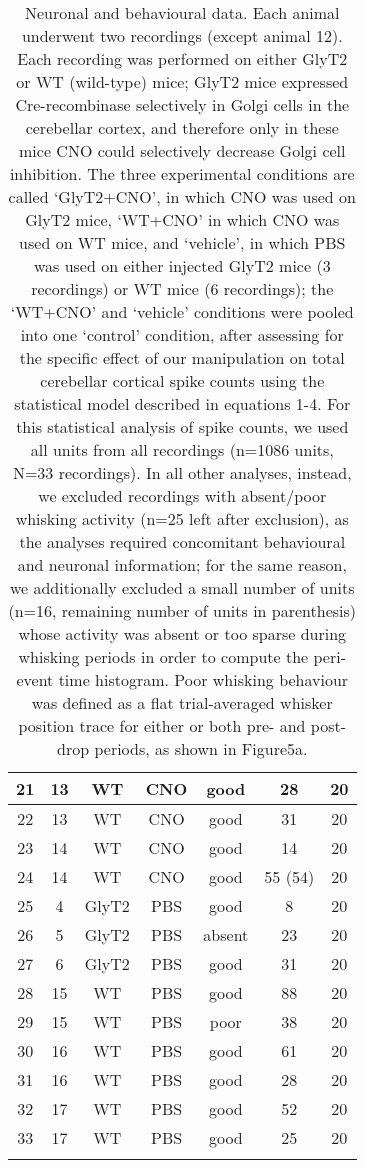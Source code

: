 \documentclass{article}
\begin{document}
\begin{longtable}{|c|c|c|c|c|c|c|}
    \hline
    \rowcolor{myblue}21 & 13 & WT & CNO & good & 28  & 20\\
    \hline
    \rowcolor{myblue}22 & 13 & WT & CNO & good & 31  & 20\\
    \hline
    \rowcolor{myblue}23 & 14 & WT & CNO & good & 14  & 20\\
    \hline
    \rowcolor{myblue}24 & 14 & WT & CNO & good & 55 (54)  & 20\\
    \hline
    \rowcolor{mygreen}25 & 4 & GlyT2 & PBS & good & 8  & 20\\
    \hline
    \rowcolor{mygreen}26 & 5 & GlyT2 & PBS & absent & 23  & 20\\
    \hline
    \rowcolor{mygreen}27 & 6 & GlyT2 & PBS & good & 31  & 20\\
    \hline
    \rowcolor{mygreen}28 & 15 & WT & PBS & good & 88  & 20\\
    \hline
    \rowcolor{mygreen}29 & 15 & WT & PBS & poor & 38  & 20\\
    \hline
    \rowcolor{mygreen}30 & 16 & WT & PBS & good & 61  & 20\\
    \hline
    \rowcolor{mygreen}31 & 16 & WT & PBS & good & 28  & 20\\
    \hline
    \rowcolor{mygreen}32 & 17 & WT & PBS & good & 52  & 20\\
    \hline
    \rowcolor{mygreen}33 & 17 & WT & PBS & good & 25  & 20\\
    \hline
    \caption[Neuronal and behavioural data]{Neuronal and behavioural data. Each animal underwent two recordings (except animal 12). Each recording was performed on either GlyT2 or WT (wild-type) mice; GlyT2 mice expressed Cre-recombinase selectively in Golgi cells in the cerebellar cortex, and therefore only in these mice CNO could selectively decrease Golgi cell inhibition. The three experimental conditions are called `GlyT2+CNO', in which CNO was used on GlyT2 mice, `WT+CNO' in which CNO was used on WT mice, and `vehicle', in which PBS was used on either injected GlyT2 mice (3 recordings) or WT mice (6 recordings); the `WT+CNO' and `vehicle' conditions were pooled into one `control' condition, after assessing for the specific effect of our manipulation on total cerebellar cortical spike counts using the statistical model described in equations 1-4. For this statistical analysis of spike counts, we used all units from all recordings (n=1086 units, N=33 recordings). In all other analyses, instead, we excluded recordings with absent/poor whisking activity (n=25 left after exclusion), as the analyses required concomitant behavioural and neuronal information; for the same reason, we additionally excluded a small number of units (n=16, remaining number of units in parenthesis) whose activity was absent or too sparse during whisking periods in order to compute the peri-event time histogram. Poor whisking behaviour was defined as a flat trial-averaged whisker position trace for either or both pre- and post- drop periods, as shown in Figure5a.}
    \label{tab:data}
  \end{longtable}

  
\end{document}
